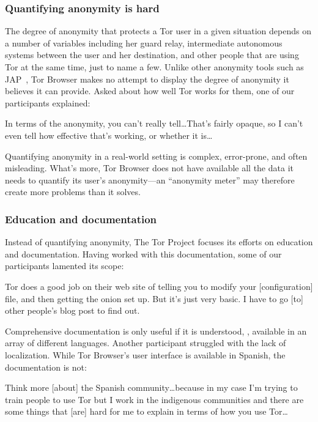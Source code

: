 \subsubsection{Quantifying anonymity is hard}

The degree of anonymity that protects a Tor user in a given situation depends on
a number of variables including her guard relay, intermediate autonomous systems
between the user and her destination, and other people that are using Tor at the
same time, just to name a few.  Unlike other anonymity tools such as
JAP~\cite{jap}, Tor Browser makes no attempt to display the degree of anonymity
it believes it can provide.  Asked about how well Tor works for them, one
of our participants explained:

\begin{displayquote}
In terms of the anonymity, you can't really tell\dots That's fairly opaque, so I
can't even tell how effective that's working, or whether it is\dots
\end{displayquote}

Quantifying anonymity in a real-world setting is complex, error-prone, and often
misleading.  What's more, Tor Browser does not have available all the data it
needs to quantify its user's anonymity---an ``anonymity meter'' may therefore
create more problems than it solves.

\subsubsection{Education and documentation}

Instead of quantifying anonymity, The Tor Project focuses its efforts on
education and documentation.  Having worked with this documentation, some of our
participants lamented its scope:

\begin{displayquote}
Tor does a good job on their web site of telling you to modify your
[configuration] file, and then getting the onion set up.  But it's just very
basic.  I have to go [to] other people's blog post to find out.
\end{displayquote}

Comprehensive documentation is only useful if it is understood, \ie, available
in an array of different languages.  Another participant struggled with the lack
of localization.  While Tor Browser's user interface is available in Spanish,
the documentation is not:

\begin{displayquote}
Think more [about] the Spanish community\dots because in my case I'm trying to
train people to use Tor but I work in the indigenous communities and there are
some things that [are] hard for me to explain in terms of how you use Tor\dots
\end{displayquote}

